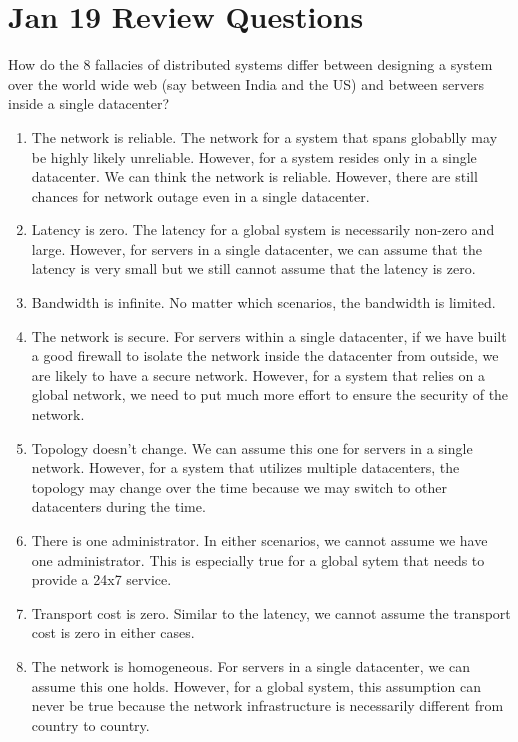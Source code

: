 \section{Jan 19 Review Questions}
\begin{QandA}
   \item How do the 8 fallacies of distributed systems differ between designing a system over the world wide web (say between India and the US) and between servers inside a single datacenter? 
         \begin{answered}
         \begin{enumerate}
          \item The network is reliable. The network for a system that spans globablly may be highly likely unreliable. However, for a system
          resides only in a single datacenter. We can think the network is reliable. However, there are still chances for network outage even
          in a single datacenter.
          \item Latency is zero. The latency for a global system is necessarily non-zero and large. However, for servers in a single datacenter, we can assume that the latency is very small but we still cannot assume that the latency is zero.
          \item Bandwidth is infinite. No matter which scenarios, the bandwidth is limited.
          \item The network is secure. For servers within a single datacenter, if we have built a good firewall to isolate the network inside the
          datacenter from outside, we are likely to have a secure network. However, for a system that relies on a global network, we need to put
          much more effort to ensure the security of the network.
          \item Topology doesn't change. We can assume this one for servers in a single network. However, for a system that utilizes multiple datacenters, the topology may change over the time because we may switch to other datacenters during the time.
          \item There is one administrator. In either scenarios, we cannot assume we have one administrator. This is especially true for a global
          sytem that needs to provide a 24x7 service.
          \item Transport cost is zero. Similar to the latency, we cannot assume the transport cost is zero in either cases.
          \item The network is homogeneous. For servers in a single datacenter, we can assume this one holds. However, for a global system, this
          assumption can never be true because the network infrastructure is necessarily different from country to country.
         \end{enumerate}
         \end{answered}


\end{QandA}
